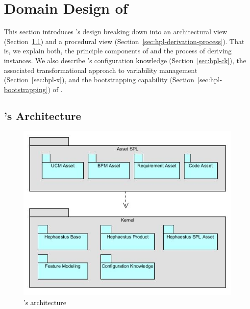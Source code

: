 
\section{Domain Design of \hpl}
\label{sec:domainDesign}

This section introduces \hpl's design breaking down into an architectural view (Section~\ref{sec:hpl-architecture}) and a procedural view (Section~\ref{sec:hpl-derivation-process}). That is, we explain both, the principle components of \hpl{} and the process of deriving \hpl{} instances. We also describe \hpl's configuration knowledge (Section~\ref{sec:hpl-ck}), the associated transformational approach to variability management (Section~\ref{sec:hpl-x}), and the bootstrapping capability (Section~\ref{sec:hpl-bootstrapping}) of \hpl.


\subsection{\hpl's Architecture} 
\label{sec:hpl-architecture}


\begin{figure}[t!]
\begin{center}
\includegraphics[width=.9\textwidth]{imagens/architecture-hpl-vf.jpg}
\end{center}
\caption{\hpl's architecture}
\label{fig:hpl-architecture}
\end{figure}

